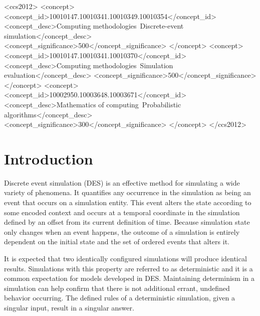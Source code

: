 \documentclass[nonacm,sigconf]{acmart}
\begin{document}
\begin{CCSXML}
  <ccs2012>
     <concept>
         <concept_id>10010147.10010341.10010349.10010354</concept_id>
         <concept_desc>Computing methodologies~Discrete-event simulation</concept_desc>
         <concept_significance>500</concept_significance>
     </concept>
     <concept>
         <concept_id>10010147.10010341.10010370</concept_id>
         <concept_desc>Computing methodologies~Simulation evaluation</concept_desc>
         <concept_significance>500</concept_significance>
     </concept>
     <concept>
         <concept_id>10002950.10003648.10003671</concept_id>
         <concept_desc>Mathematics of computing~Probabilistic algorithms</concept_desc>
         <concept_significance>300</concept_significance>
     </concept>
   </ccs2012>
\end{CCSXML}
  


\maketitle


\section{Introduction}\label{sec:introduction}
Discrete event simulation (DES) is an effective method for simulating a wide variety of phenomena. It quantifies any occurrence in the simulation as being an event that occurs on a simulation entity. This event alters the state according to some encoded context and occurs at a temporal coordinate in the simulation defined by an offset from its current definition of time. Because simulation state only changes when an event happens, the outcome of a simulation is entirely dependent on the initial state and the set of ordered events that alters it.

It is expected that two identically configured simulations will produce identical results. Simulations with this property are referred to as deterministic and it is a common expectation for models developed in DES. 
Maintaining determinism in a simulation can help confirm that there is not additional errant, undefined behavior occurring. The defined rules of a deterministic simulation, given a singular input, result in a singular answer.
\end{document}

